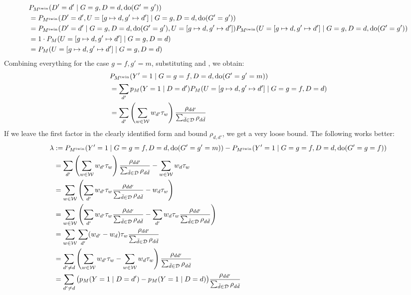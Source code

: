 {  \begin{equation*}\begin{split}
    & P_{M^{\mathrm{twin}}}(D'=d' \mid G=g,D=d,\operatorname{do}(G'=g')) \\
    & = P_{M^{\mathrm{twin}}}(D'=d', U=[g \mapsto d,g' \mapsto d'] \mid G=g,D=d,\operatorname{do}(G'=g')) \\
    & = P_{M^{\mathrm{twin}}}(D'=d' \mid G=g,D=d,\operatorname{do}(G'=g'),U=[g \mapsto d,g' \mapsto d']) P_{M^{\mathrm{twin}}}(U=[g \mapsto d,g' \mapsto d'] \mid G=g,D=d,\operatorname{do}(G'=g')) \\
    & = 1 \cdot P_M(U=[g \mapsto d,g' \mapsto d'] \mid G=g,D=d) \\
    & = P_M(U=[g \mapsto d,g' \mapsto d'] \mid G=g,D=d)
  \end{split}\end{equation*}
Combining everything for the case $g=f,g'=m$, substituting  and , we obtain:
      \begin{equation*}\begin{split}
        &P_{M^{\mathrm{twin}}}(Y'=1 \mid G=g=f,D=d,\operatorname{do}(G'=g'=m)) \\
        &= \sum_{d'} p_M(Y=1 \mid D=d') P_M(U=[g \mapsto d,g' \mapsto d'] \mid G=g=f,D=d) \\
        &= \sum_{d'} \left(\sum_{w\in \mathcal{W}} w_{d'} \tau_w\right) \frac{\rho_{d d'}}{\sum_{\bar{d} \in \mathcal{D}} \rho_{d\bar{d}}}
      \end{split}\end{equation*}
If we leave the first factor in the clearly identified form and bound $\rho_{d,d'}$, we get a very loose bound.
The following works better:
\begin{equation*}\begin{split}
  \lambda &:= P_{M^{\mathrm{twin}}}(Y'=1 \mid G=g=f,D=d,\operatorname{do}(G'=g'=m)) - 
             P_{M^{\mathrm{twin}}}(Y'=1 \mid G=g=f,D=d,\operatorname{do}(G'=g=f)) \\
          & = \sum_{d'} \left(\sum_{w\in \mathcal{W}} w_{d'} \tau_w\right) \frac{\rho_{d d'}}{\sum_{\bar{d} \in \mathcal{D}} \rho_{d\bar{d}}} - 
            \sum_{w\in \mathcal{W}} w_d \tau_w \\
          & = \sum_{w\in \mathcal{W}} \left( \sum_{d'} w_{d'} \tau_w \frac{\rho_{d d'}}{\sum_{\bar{d} \in \mathcal{D}} \rho_{d\bar{d}}} - w_d \tau_w \right) \\
          & = \sum_{w\in \mathcal{W}} \left( \sum_{d'} w_{d'} \tau_w \frac{\rho_{d d'}}{\sum_{\bar{d} \in \mathcal{D}} \rho_{d\bar{d}}} - \sum_{d'} w_d \tau_w \frac{\rho_{d d'}}{\sum_{\bar{d} \in \mathcal{D}} \rho_{d\bar{d}}} \right) \\
          & = \sum_{w\in \mathcal{W}} \sum_{d'} (w_{d'} - w_d) \tau_w \frac{\rho_{d d'}}{\sum_{\bar{d} \in \mathcal{D}} \rho_{d\bar{d}}}  \\
          & = \sum_{d'\ne d} \left(\sum_{w\in \mathcal{W}} w_{d'} \tau_w - \sum_{w\in \mathcal{W}} w_d \tau_w\right) \frac{\rho_{d d'}}{\sum_{\bar{d} \in \mathcal{D}} \rho_{d\bar{d}}} \\
          & = \sum_{d'\ne d} \big(p_M(Y=1 \mid D=d') - p_M(Y=1 \mid D=d)\big) \frac{\rho_{d d'}}{\sum_{\bar{d} \in \mathcal{D}} \rho_{d\bar{d}}}  
\end{split}\end{equation*}

}
